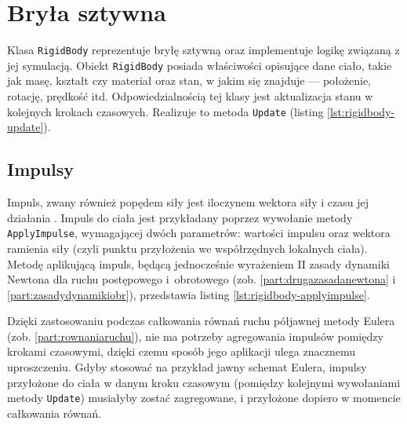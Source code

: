 \section{Bryła sztywna}
Klasa \verb|RigidBody| reprezentuje bryłę sztywną oraz implementuje logikę związaną z jej symulacją. Obiekt \verb|RigidBody| posiada właściwości opisujące dane ciało, takie jak masę, kształt czy materiał oraz stan, w jakim się znajduje --- położenie, rotację, prędkość itd. Odpowiedzialnością tej klasy jest aktualizacja stanu w kolejnych krokach czasowych. Realizuje to metoda \verb|Update| (listing \ref{lst:rigidbody-update}).

\subsection{Impulsy}
Impuls, zwany również popędem siły jest iloczynem wektora siły i czasu jej działania \cite{bib:wiki-impuls}. Impuls do ciała jest przykładany poprzez wywołanie metody \verb|ApplyImpulse|, wymagającej dwóch parametrów: wartości impulsu oraz wektora ramienia siły (czyli punktu przyłożenia we współrzędnych lokalnych ciała). Metodę aplikującą impuls, będącą jednocześnie wyrażeniem II zasady dynamiki Newtona dla ruchu postępowego i~obrotowego (zob. \ref{part:drugazasadanewtona} i \ref{part:zasadydynamikiobr}), przedstawia listing \ref{lst:rigidbody-applyimpulse}.

Dzięki zastosowaniu podczas całkowania równań ruchu półjawnej metody Eulera (zob. \ref{part:rownaniaruchu}), nie ma potrzeby agregowania impulsów pomiędzy krokami czasowymi, dzięki czemu sposób jego aplikacji ulega znacznemu uproszczeniu. Gdyby stosować na przykład jawny schemat Eulera, impulsy przyłożone do ciała w danym kroku czasowym (pomiędzy kolejnymi wywołaniami metody \verb|Update|) musiałyby zostać zagregowane, i przyłożone dopiero w momencie całkowania równań.



